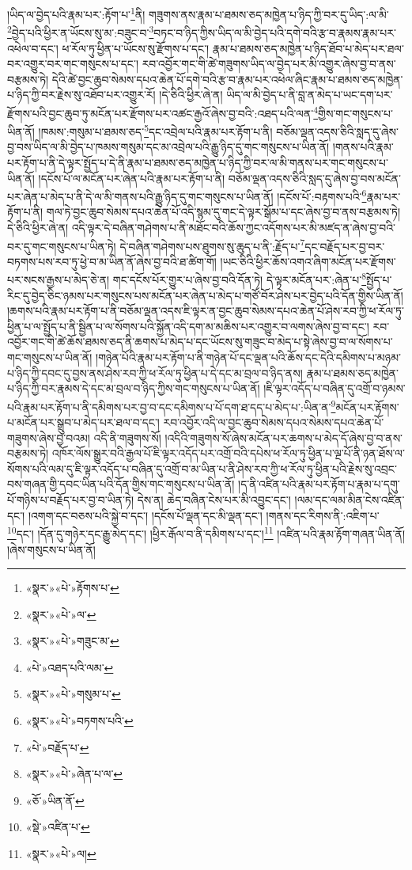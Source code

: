 །ཡིད་ལ་བྱེད་པའི་རྣམ་པར་:རྟོག་པ་\footnote{«སྣར་»«པེ་»རྟོགས་པ་}ནི། གཟུགས་ནས་རྣམ་པ་ཐམས་ཅད་མཁྱེན་པ་ཉིད་ཀྱི་བར་དུ་ཡིད་:ལ་མི་\footnote{«སྣར་»«པེ་»ལ་}བྱེད་པའི་ཕྱིར་ན་ཡོངས་སུ་མ་:བཟུང་བ་\footnote{«སྣར་»«པེ་»གཟུང་མ་}བཏང་བ་ཉིད་ཀྱིས་ཡིད་ལ་མི་བྱེད་པའི་དགེ་བའི་རྩ་བ་རྣམས་རྣམ་པར་འཕེལ་བ་དང་། ཕ་རོལ་ཏུ་ཕྱིན་པ་ཡོངས་སུ་རྫོགས་པ་དང་། རྣམ་པ་ཐམས་ཅད་མཁྱེན་པ་ཉིད་ཐོབ་པ་མེད་པར་ཐལ་བར་འགྱུར་བར་གང་གསུངས་པ་དང་། རབ་འབྱོར་གང་གི་ཚེ་གཟུགས་ཡིད་ལ་བྱེད་པར་མི་འགྱུར་ཞེས་བྱ་བ་ནས་བརྩམས་ཏེ། དེའི་ཚེ་བྱང་ཆུབ་སེམས་དཔའ་ཆེན་པོ་དགེ་བའི་རྩ་བ་རྣམ་པར་འཕེལ་ཞིང་རྣམ་པ་ཐམས་ཅད་མཁྱེན་པ་ཉིད་ཀྱི་བར་རྗེས་སུ་འཐོབ་པར་འགྱུར་རོ། །དེ་ཅིའི་ཕྱིར་ཞེ་ན། ཡིད་ལ་མི་བྱེད་པ་ནི་བླ་ན་མེད་པ་ཡང་དག་པར་རྫོགས་པའི་བྱང་ཆུབ་ཏུ་མངོན་པར་རྫོགས་པར་འཚང་རྒྱའོ་ཞེས་བྱ་བའི་:འཐད་པའི་ལན་\footnote{«པེ་»འཐད་པའི་ལམ་}གྱིས་གང་གསུངས་པ་ཡིན་ནོ། །ཁམས་:གསུམ་པ་ཐམས་ཅད་\footnote{«སྣར་»«པེ་»གསུམ་པ་}དང་འབྲེལ་པའི་རྣམ་པར་རྟོག་པ་ནི། བཅོམ་ལྡན་འདས་ཅིའི་སླད་དུ་ཞེས་བྱ་བས་ཡིད་ལ་མི་བྱེད་པ་ཁམས་གསུམ་དང་མ་འབྲེལ་པའི་རྒྱུ་ཉིད་དུ་གང་གསུངས་པ་ཡིན་ནོ། །གནས་པའི་རྣམ་པར་རྟོག་པ་ནི་དེ་ལྟར་སྤྱོད་པ་དེ་ནི་རྣམ་པ་ཐམས་ཅད་མཁྱེན་པ་ཉིད་ཀྱི་བར་ལ་མི་གནས་པར་གང་གསུངས་པ་ཡིན་ནོ། །དངོས་པོ་ལ་མངོན་པར་ཞེན་པའི་རྣམ་པར་རྟོག་པ་ནི། བཅོམ་ལྡན་འདས་ཅིའི་སླད་དུ་ཞེས་བྱ་བས་མངོན་པར་ཞེན་པ་མེད་པ་ནི་དེ་ལ་མི་གནས་པའི་རྒྱུ་ཉིད་དུ་གང་གསུངས་པ་ཡིན་ནོ། །དངོས་པོ་:བརྟགས་པའི་\footnote{«སྣར་»«པེ་»བཏགས་པའི་}རྣམ་པར་རྟོག་པ་ནི། གལ་ཏེ་བྱང་ཆུབ་སེམས་དཔའ་ཆེན་པོ་འདི་སྙམ་དུ་གང་དེ་ལྟར་སྒོམ་པ་དང་ཞེས་བྱ་བ་ནས་བརྩམས་ཏེ། དེ་ཅིའི་ཕྱིར་ཞེ་ན། འདི་ལྟར་དེ་བཞིན་གཤེགས་པ་ནི་མཐོང་བའི་ཆོས་ཀྱང་འདོགས་པར་མི་མཛད་ན་ཞེས་བྱ་བའི་བར་དུ་གང་གསུངས་པ་ཡིན་ཏེ། དེ་བཞིན་གཤེགས་པས་ཐུགས་སུ་ཆུད་པ་ནི་:རྗོད་པ་\footnote{«པེ་»བརྗོད་པ་}དང་བརྗོད་པར་བྱ་བར་བཏགས་པས་རབ་ཏུ་ཕྱེ་བ་མ་ཡིན་ནོ་ཞེས་བྱ་བའི་ཐ་ཚིག་གོ། །ཡང་ཅིའི་ཕྱིར་ཆོས་འགའ་ཞིག་མངོན་པར་རྫོགས་པར་སངས་རྒྱས་པ་མེད་ཅེ་ན། གང་དངོས་པོར་གྱུར་པ་ཞེས་བྱ་བའི་དོན་ཏེ། དེ་ལྟར་མངོན་པར་:ཞེན་པ་\footnote{«སྣར་»«པེ་»ཞེན་པ་ལ་}སྤྱོད་པ་རིང་དུ་བྱེད་ཅིང་ཉམས་པར་གསུངས་པས་མངོན་པར་ཞེན་པ་མེད་པ་གཙོ་བོར་ཤེས་པར་བྱེད་པའི་དོན་གྱིས་ཡིན་ནོ། །ཆགས་པའི་རྣམ་པར་རྟོག་པ་ནི་བཅོམ་ལྡན་འདས་ཇི་ལྟར་ན་བྱང་ཆུབ་སེམས་དཔའ་ཆེན་པོ་ཤེས་རབ་ཀྱི་ཕ་རོལ་ཏུ་ཕྱིན་པ་ལ་སྤྱོད་པ་ནི་སྦྱིན་པ་ལ་སོགས་པའི་སྐྱོན་འདི་དག་མ་མཆིས་པར་འགྱུར་བ་ལགས་ཞེས་བྱ་བ་དང་། རབ་འབྱོར་གང་གི་ཚེ་ཆོས་ཐམས་ཅད་ནི་ཆགས་པ་མེད་པ་དང་ཡོངས་སུ་གཟུང་བ་མེད་པ་སྟེ་ཞེས་བྱ་བ་ལ་སོགས་པ་གང་གསུངས་པ་ཡིན་ནོ། །གཉེན་པོའི་རྣམ་པར་རྟོག་པ་ནི་གཉེན་པོ་དང་ལྡན་པའི་ཆོས་དང་དེའི་དམིགས་པ་མཉམ་པ་ཉིད་ཀྱི་དབང་དུ་བྱས་ནས་ཤེས་རབ་ཀྱི་ཕ་རོལ་ཏུ་ཕྱིན་པ་དེ་དང་མ་བྲལ་བ་ཉིད་ནས། རྣམ་པ་ཐམས་ཅད་མཁྱེན་པ་ཉིད་ཀྱི་བར་རྣམས་དེ་དང་མ་བྲལ་བ་ཉིད་ཀྱིས་གང་གསུངས་པ་ཡིན་ནོ། །ཇི་ལྟར་འདོད་པ་བཞིན་དུ་འགྲོ་བ་ཉམས་པའི་རྣམ་པར་རྟོག་པ་ནི་དམིགས་པར་བྱ་བ་དང་དམིགས་པ་པོ་དག་ཐ་དད་པ་མེད་པ་:ཡིན་ན་\footnote{«ཅོ་»ཡིན་ནོ་}མངོན་པར་རྟོགས་པ་མངོན་པར་སྒྲུབ་པ་མེད་པར་ཐལ་བ་དང་། རབ་འབྱོར་འདི་ལ་བྱང་ཆུབ་སེམས་དཔའ་སེམས་དཔའ་ཆེན་པོ་གཟུགས་ཞེས་བྱ་བའམ། འདི་ནི་གཟུགས་སོ། །འདིའི་གཟུགས་སོ་ཞེས་མངོན་པར་ཆགས་པ་མེད་དོ་ཞེས་བྱ་བ་ནས་བརྩམས་ཏེ། འཁོར་ལོས་སྒྱུར་བའི་རྒྱལ་པོ་ཇི་ལྟར་འདོད་པར་འགྲོ་བའི་དཔེས་ཕ་རོལ་ཏུ་ཕྱིན་པ་ལྔ་པོ་ནི་ཉན་ཐོས་ལ་སོགས་པའི་ལམ་དུ་ཇི་ལྟར་འདོད་པ་བཞིན་དུ་འགྲོ་བ་མ་ཡིན་པ་ནི་ཤེས་རབ་ཀྱི་ཕ་རོལ་ཏུ་ཕྱིན་པའི་རྗེས་སུ་འབྲང་བས་གཞན་གྱི་དབང་ཡིན་པའི་དོན་གྱིས་གང་གསུངས་པ་ཡིན་ནོ། །ད་ནི་འཛིན་པའི་རྣམ་པར་རྟོག་པ་རྣམ་པ་དགུ་པོ་གཉིས་པ་བརྗོད་པར་བྱ་བ་ཡིན་ཏེ། དེས་ན། ཆེད་བཞིན་ངེས་པར་མི་འབྱུང་དང་། །ལམ་དང་ལམ་མིན་ངེས་འཛིན་དང་། །འགག་དང་བཅས་པའི་སྐྱེ་བ་དང་། །དངོས་པོ་ལྡན་དང་མི་ལྡན་དང་། །གནས་དང་རིགས་ནི་:འཇིག་པ་\footnote{«སྡེ་»འཛིན་པ་}དང་། །དོན་དུ་གཉེར་དང་རྒྱུ་མེད་དང་། །ཕྱིར་རྒོལ་བ་ནི་དམིགས་པ་དང་།\footnote{«སྣར་»«པེ་»ལ།} །འཛིན་པའི་རྣམ་རྟོག་གཞན་ཡིན་ནོ། །ཞེས་གསུངས་པ་ཡིན་ནོ། 
